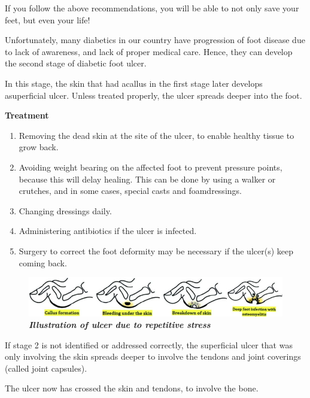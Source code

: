 If you follow the above reco\-mmenda\-tions, you will be able to not only save your feet, but even your life!


Unfortunately, many diabetics in our country have progression of foot disease due to lack of awareness, and lack of proper medical care. Hence, they can deve\-lop the second stage of diabetic foot ulcer.

In this stage, the skin that had a\break callus in the first stage later develops a\break superficial ulcer. Unless treated pro\-perly, the ulcer spreads deeper into the foot.


\noindent\textbf{Treatment}
\begin{enumerate}[•]
\itemsep=0pt
\item Removing the dead skin at the site of the ulcer, to enable healthy tissue to grow back.
\item Avoiding weight bearing on the affected foot to prevent pressure points, because this will delay healing. This can be done by using a walker or crutches, and in some cases, special casts and foam\break dressings.
\item Changing dressings daily.
\item Administering antibiotics if the ulcer is infected.
\item Surgery to correct the foot deformity may be necessary if the ulcer(s) keep coming back.
\end{enumerate}

\begin{figure}[h]
\centering
\includegraphics[scale=2.4]{images/067.jpg}\\
\textbf{\textit{Illustration of ulcer due to repetitive stress}}
\end{figure}


If stage 2 is not identified or addressed correctly, the superficial ulcer that was only involving the skin spreads deeper to involve the tendons and joint coverings (called joint capsules).


The ulcer now has crossed the skin and tendons, to involve the bone.

